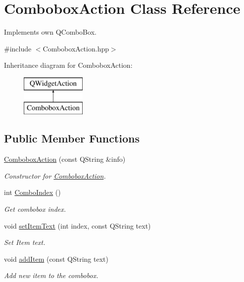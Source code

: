 \hypertarget{classComboboxAction}{}\section{Combobox\+Action Class Reference}
\label{classComboboxAction}


Implements own Q\+Combo\+Box.  




{\ttfamily \#include $<$Combobox\+Action.\+hpp$>$}

Inheritance diagram for Combobox\+Action\+:\begin{figure}[H]
\begin{center}
\leavevmode
\includegraphics[height=2.000000cm]{classComboboxAction}
\end{center}
\end{figure}
\subsection*{Public Member Functions}
\begin{DoxyCompactItemize}
\item 
\mbox{\hyperlink{classComboboxAction_afa2a6bfade094a82beef7d478c5a4cf8}{Combobox\+Action}} (const Q\+String \&info)
\begin{DoxyCompactList}\small\item\em Constructor for \mbox{\hyperlink{classComboboxAction}{Combobox\+Action}}. \end{DoxyCompactList}\item 
int \mbox{\hyperlink{classComboboxAction_adfe475154e5b88eddbc9a51759bdf312}{Combo\+Index}} ()
\begin{DoxyCompactList}\small\item\em Get combobox index. \end{DoxyCompactList}\item 
void \mbox{\hyperlink{classComboboxAction_ac216fa96660ef568af946eb2fc58746e}{set\+Item\+Text}} (int index, const Q\+String text)
\begin{DoxyCompactList}\small\item\em Set Item text. \end{DoxyCompactList}\item 
void \mbox{\hyperlink{classComboboxAction_a3472e15614e868dbf300fdbcbc5a011c}{add\+Item}} (const Q\+String text)
\begin{DoxyCompactList}\small\item\em Add new item to the combobox. \end{DoxyCompactList}\end{DoxyCompactItemize}


